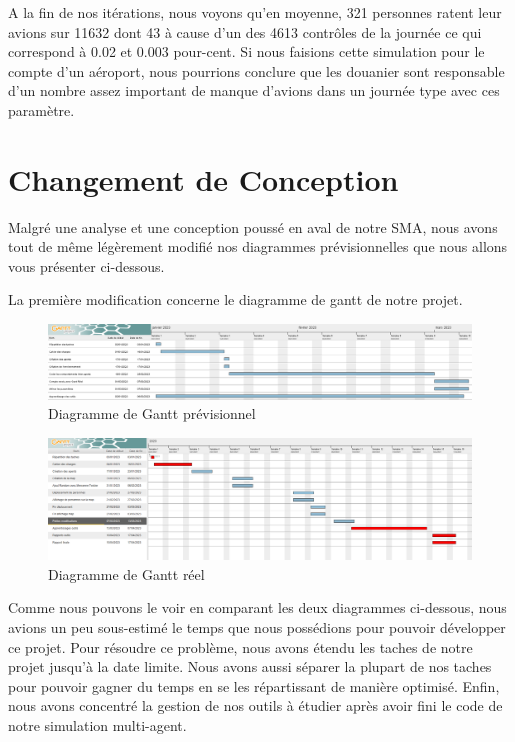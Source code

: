 \documentclass[12pt,french]{article} %
\begin{document}
A la fin de nos itérations, nous voyons qu'en moyenne, 321 personnes ratent leur avions sur 11632 dont 43 à cause d'un des 4613 contrôles de la journée ce qui correspond à 0.02 et 0.003 pour-cent.
Si nous faisions cette simulation pour le compte d'un aéroport, nous pourrions conclure que les douanier sont responsable d'un nombre assez important de manque d'avions dans un journée type avec ces paramètre.  

\section{Changement de Conception}

Malgré une analyse et une conception poussé en aval de notre SMA, nous avons tout de même légèrement modifié nos diagrammes prévisionnelles que nous allons vous présenter ci-dessous.
\newline

La première modification concerne le diagramme de gantt de notre projet.

\begin{figure}[H]
	\centering
	\includegraphics[scale=0.35]{gantt.png}
	\caption{Diagramme de Gantt prévisionnel}    
\end{figure}

\begin{figure}[H]
	\centering
	\includegraphics[scale=0.285]{ganntreel.png}
	\caption{Diagramme de Gantt réel}   
\end{figure}
 
 Comme nous pouvons le voir en comparant les deux diagrammes ci-dessous, nous avions un peu sous-estimé le temps que nous possédions pour pouvoir développer ce projet. Pour résoudre ce problème, nous avons étendu les taches de notre projet jusqu'à la date limite. Nous avons aussi séparer la plupart de nos taches pour pouvoir gagner du temps en se les répartissant de manière optimisé. Enfin, nous avons concentré la gestion de nos outils à étudier après avoir fini le code de notre simulation multi-agent.
 
\end{document}
